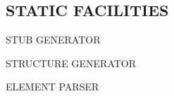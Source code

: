 \begin{bwslide}
\begin{tgrind}
\let\linebox=\relax
\def\_{\ifstring{\char'137}\else\underline{\ }\fi}
\relax
\end{tgrind}
\end{bwslide}


\begin{bwslide}
\begin{tgrind}
\let\linebox=\relax
\def\_{\ifstring{\char'137}\else\underline{\ }\fi}
\relax
\end{tgrind}
\end{bwslide}


\begin{bwslide}
\begin{tgrind}\scriptsize
\let\linebox=\relax
\def\_{\ifstring{\char'137}\else\underline{\ }\fi}
\relax
\end{tgrind}
\end{bwslide}


\begin{bwslide}
\begin{tgrind}\scriptsize
\let\linebox=\relax
\def\_{\ifstring{\char'137}\else\underline{\ }\fi}
\relax
\end{tgrind}
\end{bwslide}


\begin{bwslide}
\begin{tgrind}\scriptsize
\let\linebox=\relax
\def\_{\ifstring{\char'137}\else\underline{\ }\fi}
\relax
\end{tgrind}
\end{bwslide}


\begin{bwslide}
\begin{tgrind}\scriptsize
\let\linebox=\relax
\def\_{\ifstring{\char'137}\else\underline{\ }\fi}
\relax
\end{tgrind}
\end{bwslide}


\begin{bwslide}
\part	{STATIC FACILITIES}\bf

\begin{nrtc}
\item	STUB GENERATOR

\item	STRUCTURE GENERATOR

\item	ELEMENT PARSER
\end{nrtc}
\end{bwslide}


